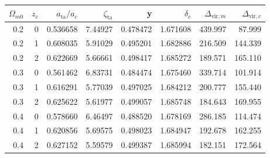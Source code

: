 \begin{tabular}{rrrrrrrr}
\toprule
$\Omega_{m0}$ & $z_c$ & $a_\mathrm{ta}/a_c$ & $\zeta_\mathrm{ta}$ & y & $\delta_c$ & $\Delta_{\mathrm{vir},m}$ & $\Delta_{\mathrm{vir},c}$ \\
\midrule
0.2 & 0 & 0.536658 & 7.44927 & 0.478472 & 1.671608 & 439.997 & 87.999 \\
0.2 & 1 & 0.608035 & 5.91029 & 0.495201 & 1.682886 & 216.509 & 144.339 \\
0.2 & 2 & 0.622669 & 5.66661 & 0.498417 & 1.685272 & 189.571 & 165.110 \\
0.3 & 0 & 0.561462 & 6.83731 & 0.484474 & 1.675460 & 339.714 & 101.914 \\
0.3 & 1 & 0.616291 & 5.77039 & 0.497025 & 1.684212 & 200.777 & 155.440 \\
0.3 & 2 & 0.625622 & 5.61977 & 0.499057 & 1.685748 & 184.643 & 169.955 \\
0.4 & 0 & 0.578660 & 6.46497 & 0.488520 & 1.678169 & 286.185 & 114.474 \\
0.4 & 1 & 0.620856 & 5.69575 & 0.498023 & 1.684947 & 192.678 & 162.255 \\
0.4 & 2 & 0.627152 & 5.59579 & 0.499387 & 1.685994 & 182.151 & 172.564 \\
\bottomrule
\end{tabular}
